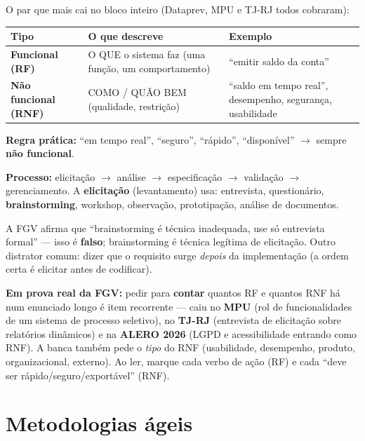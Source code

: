 O par que mais cai no bloco inteiro (Dataprev, MPU e TJ-RJ todos cobraram):

\begin{center}
\begin{tabular}{@{}p{2.6cm}p{5.4cm}p{5cm}@{}}
\toprule
\textbf{Tipo} & \textbf{O que descreve} & \textbf{Exemplo} \\
\midrule
\textbf{Funcional (RF)} & O QUE o sistema faz (uma função, um comportamento) & ``emitir saldo da conta'' \\
\textbf{Não funcional (RNF)} & COMO / QUÃO BEM (qualidade, restrição) & ``saldo em tempo real'', desempenho, segurança, usabilidade \\
\bottomrule
\end{tabular}
\end{center}

\textbf{Regra prática:} ``em tempo real'', ``seguro'', ``rápido'',
``disponível'' $\to$ sempre \textbf{não funcional}.

\textbf{Processo:} elicitação $\to$ análise $\to$ especificação $\to$
validação $\to$ gerenciamento. A \textbf{elicitação} (levantamento) usa:
entrevista, questionário, \textbf{brainstorming}, workshop, observação,
prototipação, análise de documentos.

\begin{pegadinha}
A FGV afirma que ``brainstorming é técnica inadequada, use só entrevista
formal'' --- isso é \textbf{falso}; brainstorming é técnica legítima de
elicitação. Outro distrator comum: dizer que o requisito surge \emph{depois}
da implementação (a ordem certa é elicitar antes de codificar).
\end{pegadinha}

\begin{jacaiu}
\textbf{Em prova real da FGV:} pedir para \textbf{contar} quantos RF e quantos
RNF há num enunciado longo é item recorrente --- caiu no \textbf{MPU} (rol de
funcionalidades de um sistema de processo seletivo), no \textbf{TJ-RJ}
(entrevista de elicitação sobre relatórios dinâmicos) e na \textbf{ALERO 2026}
(LGPD e acessibilidade entrando como RNF). A banca também pede o \emph{tipo}
do RNF (usabilidade, desempenho, produto, organizacional, externo). Ao ler,
marque cada verbo de ação (RF) e cada ``deve ser rápido/seguro/exportável''
(RNF).
\end{jacaiu}

\section{Metodologias ágeis}


